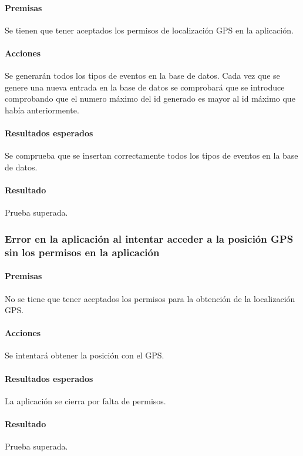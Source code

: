 \paragraph{Premisas}
Se tienen que tener aceptados los permisos de localización GPS en la aplicación.


\paragraph{Acciones}
Se generarán todos los tipos de eventos en la base de datos.
Cada vez que se genere una nueva entrada en la base de datos se comprobará que se introduce comprobando que el numero máximo del id generado es mayor al id máximo que había anteriormente.

\paragraph{Resultados esperados}

Se comprueba que se insertan correctamente todos los tipos de eventos en la base de datos.

\paragraph{Resultado}
Prueba superada.


\subsubsection{Error en la aplicación al intentar acceder a la posición GPS sin los permisos en la aplicación}

\paragraph{Premisas}
No se tiene que tener aceptados los permisos para la obtención de la localización GPS.


\paragraph{Acciones}
Se intentará obtener la posición con el GPS.

\paragraph{Resultados esperados}
La aplicación se cierra por falta de permisos.

\paragraph{Resultado}
Prueba superada.

